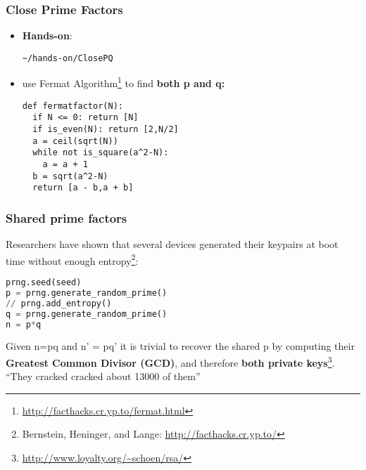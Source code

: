 \begin{frame}[fragile]
  \frametitle{Close Prime Factors}
  \begin{itemize}
\item {\bf Hands-on}:

\begin{lstlisting}
~/hands-on/ClosePQ
\end{lstlisting}

   \item use Fermat Algorithm\footnote{\url{http://facthacks.cr.yp.to/fermat.html}} to find {\bf both p and q:}

\begin{lstlisting}[basicstyle=\tiny]
def fermatfactor(N):
  if N <= 0: return [N]
  if is_even(N): return [2,N/2]
  a = ceil(sqrt(N))
  while not is_square(a^2-N):
    a = a + 1
  b = sqrt(a^2-N)
  return [a - b,a + b]
\end{lstlisting}

  \end{itemize}
 
\end{frame}

\begin{frame}[fragile]
  \frametitle{Shared prime factors}
     Researchers have shown that several devices generated their keypairs
   at boot time without enough entropy\footnote{Bernstein, Heninger, and Lange: \url{http://facthacks.cr.yp.to/}}:
   
\begin{lstlisting}[language=python, basicstyle=\tiny]
prng.seed(seed)
p = prng.generate_random_prime()
// prng.add_entropy()
q = prng.generate_random_prime()
n = p*q
\end{lstlisting}

Given n=pq and n' = pq' it is trivial to recover the shared p by computing their
{\bf Greatest Common Divisor (GCD)}, and therefore {\bf both private
  keys}\footnote{\url{http://www.loyalty.org/~schoen/rsa/}}.\\
\vspace{5mm}
``They cracked cracked about 13000 of them''
\end{frame}

